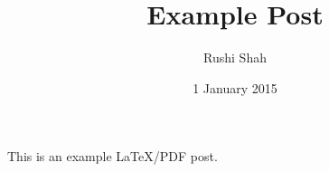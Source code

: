 \documentclass{article}
\author{Rushi Shah}
\date{1 January 2015}
\title{Example Post}
\begin{document}
\maketitle
This is an example LaTeX/PDF post.
\end{document}
